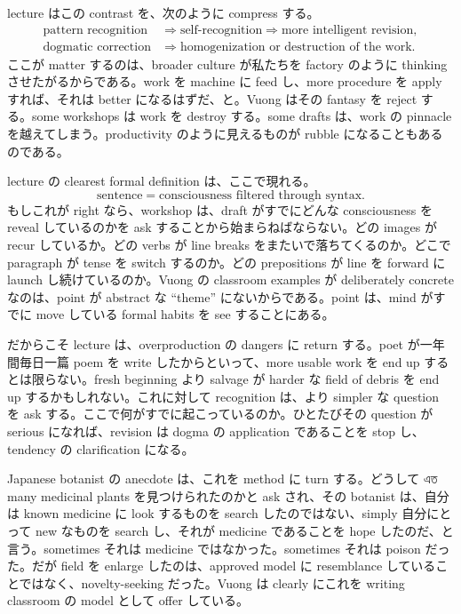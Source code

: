 lecture はこの contrast を、次のように compress する。
\begin{align}
\text{pattern recognition} &\Longrightarrow \text{self-recognition} \Longrightarrow \text{more intelligent revision},\\
\text{dogmatic correction} &\Longrightarrow \text{homogenization or destruction of the work}.
\end{align}
ここが matter するのは、broader culture が私たちを factory のように thinking させたがるからである。work を machine に feed し、more procedure を apply すれば、それは better になるはずだ、と。Vuong はその fantasy を reject する。some workshops は work を destroy する。some drafts は、work の pinnacle を越えてしまう。productivity のように見えるものが rubble になることもあるのである。

lecture の clearest formal definition は、ここで現れる。
\begin{equation}
\text{sentence} = \text{consciousness filtered through syntax}.
\end{equation}
もしこれが right なら、workshop は、draft がすでにどんな consciousness を reveal しているのかを ask することから始まらねばならない。どの images が recur しているか。どの verbs が line breaks をまたいで落ちてくるのか。どこで paragraph が tense を switch するのか。どの prepositions が line を forward に launch し続けているのか。Vuong の classroom examples が deliberately concrete なのは、point が abstract な ``theme'' にないからである。point は、mind がすでに move している formal habits を see することにある。

だからこそ lecture は、overproduction の dangers に return する。poet が一年間毎日一篇 poem を write したからといって、more usable work を end up するとは限らない。fresh beginning より salvage が harder な field of debris を end up するかもしれない。これに対して recognition は、より simpler な question を ask する。ここで何がすでに起こっているのか。ひとたびその question が serious になれば、revision は dogma の application であることを stop し、tendency の clarification になる。

Japanese botanist の anecdote は、これを method に turn する。どうして এত many medicinal plants を見つけられたのかと ask され、その botanist は、自分は known medicine に look するものを search したのではない、simply 自分にとって new なものを search し、それが medicine であることを hope したのだ、と言う。sometimes それは medicine ではなかった。sometimes それは poison だった。だが field を enlarge したのは、approved model に resemblance していることではなく、novelty-seeking だった。Vuong は clearly にこれを writing classroom の model として offer している。

